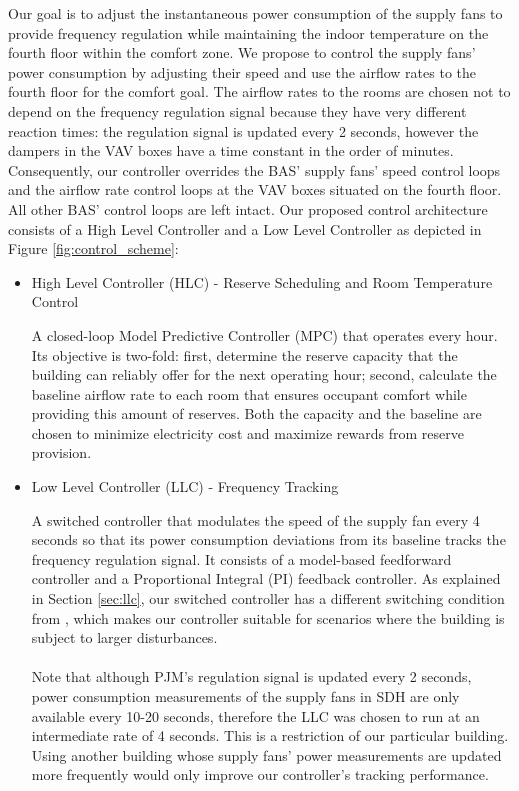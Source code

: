 Our goal is to adjust the instantaneous power consumption of the supply fans to provide frequency regulation while maintaining the indoor temperature on the fourth floor within the comfort zone.
We propose to control the supply fans' power consumption by adjusting their speed and use the airflow rates to the fourth floor for the comfort goal.
The airflow rates to the rooms are chosen not to depend on the frequency regulation signal because they have very different reaction times: the regulation signal is updated every 2 seconds, however the dampers in the VAV boxes have a  time constant in the order of minutes.
Consequently, our controller overrides the BAS' supply fans' speed control loops and the airflow rate control loops at the VAV boxes situated on the fourth floor. 
All other BAS' control loops are left intact.
Our proposed control architecture consists of a High Level Controller and a Low Level Controller as depicted in Figure \ref{fig:control_scheme}:

\begin{itemize}
	\item{High Level Controller (HLC) - Reserve Scheduling and Room Temperature Control}\label{sec:high_level}

A closed-loop Model Predictive Controller (MPC) that operates every hour. Its objective is two-fold: first, determine the reserve capacity that the building can reliably offer for the next operating hour; second, calculate the baseline airflow rate to each room that ensures occupant comfort while providing this amount of reserves.
Both the capacity and the baseline are chosen to minimize electricity cost and maximize rewards from reserve provision.

	\item{Low Level Controller (LLC) - Frequency Tracking}\label{sec:low_level}

A switched controller that modulates the speed of the supply fan every 4 seconds so that its power consumption deviations from its baseline tracks the frequency regulation signal.
It consists of a model-based feedforward controller and a Proportional Integral (PI) feedback controller.
As explained in Section \ref{sec:llc}, our switched controller has a different switching condition from \cite{Vrettos:2016flexlab1}, which makes our controller suitable for scenarios where the building is subject to larger disturbances.
\\
\\
Note that although PJM's regulation signal is updated every 2 seconds, power consumption measurements of the supply fans in SDH are only available every 10-20 seconds, therefore the LLC was chosen to run at an intermediate rate of 4 seconds. This is a restriction of our particular building. Using another building whose supply fans' power measurements are updated more frequently would only improve our controller's tracking performance.
\end{itemize}


